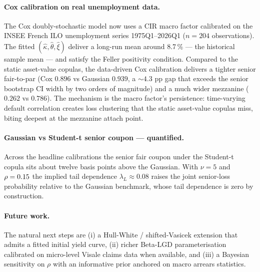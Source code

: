 \paragraph{Cox calibration on real unemployment data.}
The Cox doubly-stochastic model now uses a CIR macro factor calibrated
on the INSEE French ILO unemployment series 1975Q1–2026Q1 ($n = 204$
observations). The fitted $(\hat\kappa, \hat\theta, \hat\xi)$ deliver a
long-run mean around 8.7\,\% — the historical sample mean — and satisfy
the Feller positivity condition. Compared to the static asset-value copulas, the data-driven Cox
calibration delivers a tighter senior fair-to-par (Cox $0.896$ vs
Gaussian $0.939$, a $\sim 4.3$ pp gap that exceeds the senior bootstrap
CI width by two orders of magnitude) and a much wider mezzanine
($0.262$ vs $0.786$). The mechanism is the macro factor's persistence:
time-varying default correlation creates loss clustering that the
static asset-value copulas miss, biting deepest at the mezzanine
attach point.

\paragraph{Gaussian vs Student-t senior coupon — quantified.}
Across the headline calibrations the senior fair coupon under the
Student-t copula sits about twelve basis points above the Gaussian.
With $\nu = 5$ and $\rho = 0.15{}$ the implied tail dependence
$\lambda_L \approx 0.08$ raises the joint senior-loss probability
relative to the Gaussian benchmark, whose tail dependence is zero by
construction.

\paragraph{Future work.}
The natural next steps are (i) a Hull-White / shifted-Vasicek extension
that admits a fitted initial yield curve, (ii) richer Beta-LGD
parameterisation calibrated on micro-level Visale claims data when
available, and (iii) a Bayesian sensitivity on $\rho$ with an informative
prior anchored on macro arrears statistics.
